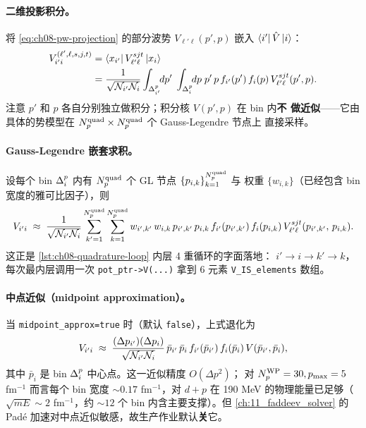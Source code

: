 \paragraph{二维投影积分。}
将 \cref{eq:ch08-pw-projection} 的部分波势 \(V_{\ell' \ell}(p', p)\) 嵌入
\(\bra{i'}\hat{V}\ket{i}\)：
\begin{align}
\label{eq:ch08-Vmat-WP}
V_{i' i}^{(\ell', \ell, s, j, t)}
&= \bra{x_{i'}} V_{\ell' \ell}^{s j t} \ket{x_i} \notag\\
&= \frac{1}{\sqrt{\mathcal{N}_{i'} \mathcal{N}_i}}
   \int_{\Delta_{i'}^{p}}\!\!dp'\;
   \int_{\Delta_{i}^{p}}\!\!dp\;
   p'\, p\, f_{i'}(p')\, f_i(p)\,
   V_{\ell' \ell}^{s j t}(p', p).
\end{align}
注意 \(p'\) 和 \(p\) 各自分别独立做积分；积分核 \(V(p', p)\) 在 bin 内\textbf{不
做近似}——它由具体的势模型在 \({N_{p}^{\text{quad}}} \times {N_{p}^{\text{quad}}}\) 个 Gauss-Legendre 节点上
直接采样。

\paragraph{Gauss-Legendre 嵌套求积。}
设每个 bin \(\Delta_{i}^{p}\) 内有 \({N_{p}^{\text{quad}}}\) 个 GL 节点 \(\{p_{i, k}\}_{k=1}^{{N_{p}^{\text{quad}}}}\) 与
权重 \(\{w_{i, k}\}\)（已经包含 bin 宽度的雅可比因子），则
\begin{equation}
\label{eq:ch08-Vmat-WP-GL}
V_{i' i} \;\approx\;
\frac{1}{\sqrt{\mathcal{N}_{i'} \mathcal{N}_i}}
\sum_{k'=1}^{{N_{p}^{\text{quad}}}} \sum_{k=1}^{{N_{p}^{\text{quad}}}}
w_{i', k'}\, w_{i, k}\,
p_{i', k'}\, p_{i, k}\,
f_{i'}(p_{i', k'})\, f_i(p_{i, k})\,
V_{\ell' \ell}^{s j t}(p_{i', k'},\, p_{i, k}).
\end{equation}
这正是 \cref{lst:ch08-quadrature-loop} 内层 4 重循环的字面落地：
\(i' \to i \to k' \to k\)，每次最内层调用一次 \texttt{pot\_ptr->V(...)} 拿到 6
元素 \texttt{V\_IS\_elements} 数组。

\paragraph{中点近似（midpoint approximation）。}
当 \texttt{midpoint\_approx=true} 时（默认 \texttt{false}），上式退化为
\begin{equation}
\label{eq:ch08-Vmat-WP-midpoint}
V_{i' i} \;\approx\;
\frac{(\Delta p_{i'})(\Delta p_i)}{\sqrt{\mathcal{N}_{i'} \mathcal{N}_i}}\,
\bar{p}_{i'}\, \bar{p}_i\,
f_{i'}(\bar{p}_{i'})\, f_i(\bar{p}_i)\,
V(\bar{p}_{i'}, \bar{p}_i),
\end{equation}
其中 \(\bar{p}_i\) 是 bin \(\Delta_{i}^{p}\) 中心点。这一近似精度 \(O(\Delta p^2)\)；
对 \({N_{p}^{\text{WP}}} = 30, p_{\max} = 5\) fm\(^{-1}\) 而言每个 bin 宽度 \(\sim 0.17\)
fm\(^{-1}\)，对 \(d+p\) 在 190 MeV 的物理能量已足够（\(\sqrt{m E} \sim 2\)
fm\(^{-1}\)，约 \(\sim 12\) 个 bin 内含主要支撑）。但 \cref{ch:11_faddeev_solver}
的 Padé 加速对中点近似敏感，故生产作业默认\textbf{关}它。

